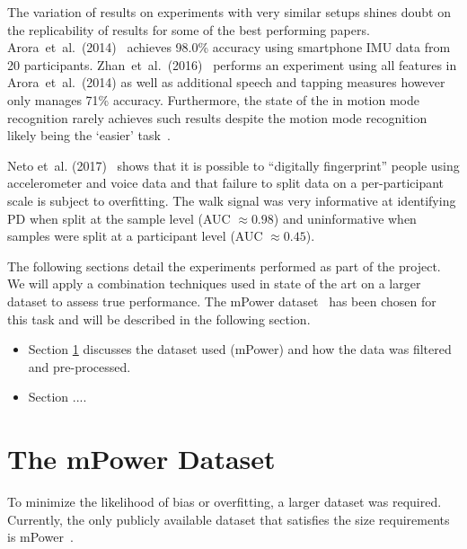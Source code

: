 \documentclass[12pt, twoside]{book}
\begin{document}
The variation of results on experiments with very similar setups shines doubt on the replicability of results for some of the best performing papers. Arora~et~al.~(2014)~\cite{arora2014high} achieves 98.0\% accuracy using smartphone IMU data from 20 participants. Zhan~et~al.~(2016)~\cite{zhan2016high} performs an experiment using all features in Arora~et~al.~(2014) as well as additional speech and tapping measures however only manages 71\% accuracy. Furthermore, the state of the in motion mode recognition rarely achieves such results despite the motion mode recognition likely being the `easier' task~\cite{motionmoderecognition}. 

Neto et~al. (2017)~\cite{mpowerneto2017analysis} shows that it is possible to ``digitally fingerprint'' people using accelerometer and voice data and that failure to split data on a per-participant scale is subject to overfitting. The walk signal was very informative at identifying PD when split at the sample level (AUC $\approx 0.98$) and uninformative when samples were split at a participant level (AUC $\approx 0.45$). 
 
The following sections detail the experiments performed as part of the project. We will apply a combination techniques used in state of the art on a larger dataset to assess true performance. The mPower dataset~\cite{mpower} has been chosen for this  task and will be described in the following section.

\begin{itemize}
\item Section \ref{mpower} discusses the dataset used (mPower) and how the data was filtered and pre-processed.
\item Section ....
\end{itemize}

\section{The mPower Dataset}
\label{mpower}
To minimize the likelihood of bias or overfitting, a larger dataset was required. Currently, the only publicly available dataset that satisfies the size requirements is mPower~\cite{mpower}. 
\end{document}

